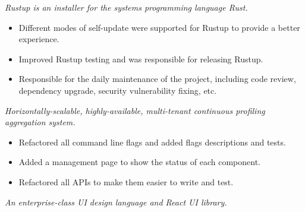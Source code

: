 \documentclass{resume}
\newcommand{\en}[1]{#1}
\newcommand{\zh}[1]{}
\begin{document}
\en{}
\zh{\datedsubsection{\textbf{Rustup - 活跃维护者}}{{\href{https://github.com/rust-lang/rustup/commits?author=hi-rustin}{110+ commits}}}}
\en{\textsl{Rustup is an installer for the systems programming language Rust.}}
\zh{\textsl{Rustup 是 Rust 的安装器。}}

\begin{itemize}
      \item \en{Different modes of self-update were supported for Rustup to provide a better experience.}
            \zh{为 Rustup 支持了 self-update 的不同模式来提供更好的使用体验。}
      \item \en{Improved Rustup testing and was responsible for releasing Rustup.}
            \zh{改善 Rustup 测试，负责发布 Rustup。}
      \item \en{Responsible for the daily maintenance of the project, including code review, dependency upgrade, security vulnerability fixing, etc.}
            \zh{负责项目日常维护，包括代码审查、依赖升级、安全漏洞修复等。}
\end{itemize}

\en{}
\zh{\datedsubsection{\textbf{Phlare - 活跃贡献者}}{{\href{https://github.com/grafana/phlare/commits?author=hi-rustin}{28+ commits}}}}
\en{\textsl{Horizontally-scalable, highly-available, multi-tenant continuous profiling aggregation system.}}
\zh{\textsl{水平扩展、高可用、多租户的持续性能分析聚合系统。}}

\begin{itemize}
      \item \en{Refactored all command line flags and added flags descriptions and tests.}
            \zh{重构了所有命令行参数，并添加了参数说明和测试。}
      \item \en{Added a management page to show the status of each component.}
            \zh{添加了管理页面展示各组件状态。}
      \item \en{Refactored all APIs to make them easier to write and test.}
            \zh{重构了所有 API 使其更容易编写和测试。}
\end{itemize}

\en{}
\zh{\datedsubsection{\textbf{ant-design - 前维护者}}{{\href{https://github.com/ant-design/ant-design/commits?author=hi-rustin}{24+ commits}}}}
\en{\textsl{An enterprise-class UI design language and React UI library.}}
\zh{\textsl{企业级 UI 设计语言和 React UI 库。}}
\end{document}
